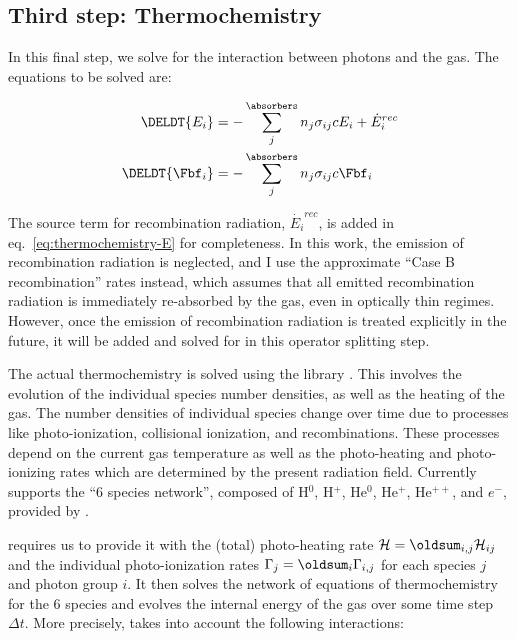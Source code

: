 \subsection{Third step: Thermochemistry}


In this final step, we solve for the interaction between photons and the gas. The equations to be
solved are:

\begin{align}
	\DELDT{E_i}  &=
		- \sum\limits_{j}^{\absorbers} n_j \sigma_{i j} c E_i + \dot E_i ^{rec}
\label{eq:thermochemistry-E} \\
	\DELDT{\Fbf_i} &=
		- \sum\limits_{j}^{\absorbers} n_j \sigma_{i j} c \Fbf_i \label{eq:thermochemistry-F}
\end{align}

The source term for recombination radiation, $\dot{E_i}^{rec}$, is added in
eq.~\ref{eq:thermochemistry-E} for completeness. In this work, the emission of recombination
radiation is neglected, and I use the approximate ``Case B recombination'' rates instead, which
assumes that all emitted recombination radiation is immediately re-absorbed by the gas, even in
optically thin regimes. However, once the emission of recombination radiation is treated explicitly
in the future, it will be added and solved for in this operator splitting step.

The actual thermochemistry is solved using the \grackle library
\citep{smithGrackleChemistryCooling2017}. This involves the evolution of the individual species
number densities, as well as the heating of the gas. The number densities of individual species
change over time due to processes like photo-ionization, collisional ionization, and recombinations.
These processes depend on the current gas temperature as well as the photo-heating and photo-ionizing rates which are determined by the present radiation field. Currently \GEARRT supports the ``6 species network'', composed of H$^0$, H$^+$, He$^0$, He$^+$, He$^{++}$, and $e^{-}$, provided by \grackle.

\grackle requires us to provide it with the (total) photo-heating rate $\mathcal{H} =
\oldsum_{i,j} \mathcal{H}_{ij}$ and the individual photo-ionization rates $\Gamma_{j} = \oldsum_i
\Gamma_{i,j}$ for each species $j$ and photon group $i$. It then solves the network of equations of
thermochemistry for the 6 species and evolves the internal energy of the gas over some time step
$\Delta t$. More precisely, \grackle takes into account the following interactions:


